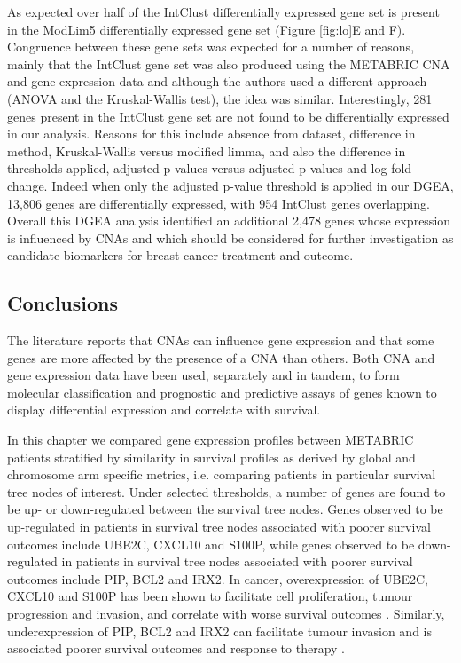 As expected over half of the IntClust differentially expressed gene set is present in the ModLim5 differentially expressed gene set (Figure \ref{fig:lo}E and F). Congruence between these gene sets was expected for a number of reasons, mainly that the IntClust gene set was also produced using the METABRIC CNA and gene expression data and although the authors used a different approach (ANOVA and the Kruskal-Wallis test), the idea was similar. Interestingly, 281 genes present in the IntClust gene set are not found to be differentially expressed in our analysis. Reasons for this include absence from dataset, difference in method, Kruskal-Wallis versus modified limma, and also the difference in thresholds applied, adjusted p-values versus adjusted p-values and log-fold change. Indeed when only the adjusted p-value threshold is applied in our DGEA, 13,806 genes are differentially expressed, with 954 IntClust genes overlapping. Overall this DGEA analysis identified an additional 2,478 genes whose expression is influenced by CNAs and which should be considered for further investigation as candidate biomarkers for breast cancer treatment and outcome.

\subsection{Conclusions}
The literature reports that CNAs can influence gene expression and that some genes are more affected by the presence of a CNA than others. Both CNA and gene expression data have been used, separately and in tandem, to form molecular classification and prognostic and predictive assays of genes known to display differential expression and correlate with survival.   

In this chapter we compared gene expression profiles between METABRIC patients stratified by similarity in survival profiles as derived by global and chromosome arm specific metrics, i.e. comparing patients in particular survival tree nodes of interest. Under selected thresholds, a number of genes are found to be up- or down-regulated between the survival tree nodes. Genes observed to be up-regulated in patients in survival tree nodes associated with poorer survival outcomes include UBE2C, CXCL10 and S100P, while genes observed to be down-regulated in patients in survival tree nodes associated with poorer survival outcomes include PIP, BCL2 and IRX2. In cancer, overexpression of UBE2C, CXCL10 and S100P has been shown to facilitate cell proliferation, tumour progression and invasion, and correlate with worse survival outcomes \citep{pmid21195708, pmid31067633, pmid33681290}. Similarly, underexpression of PIP, BCL2 and IRX2 can facilitate tumour invasion and is associated poorer survival outcomes and response to therapy \citep{pmid20664598, pmid26560478, pmid30555735}. 

